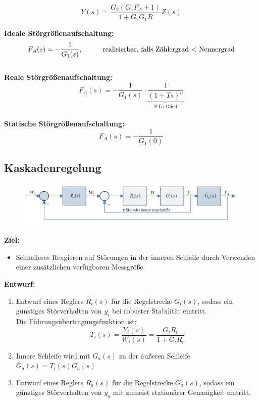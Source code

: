 \documentclass[10pt,a4paper]{article}
\newcommand{\tab}[1][1]{\hspace*{#1cm}}
\begin{document}
$$
	Y(s) = \frac{G_2(G_1 F_A + 1)}{1 + G_2 G_1 R} Z(s)
$$

\textbf{Ideale Störgrößenaufschaltung:}
$$
	F_A(s) = -\frac{1}{G_1(s)}, \tab \text{realisierbar, falls Zählergrad $<$ Nennergrad}
$$ ~\\

\textbf{Reale Störgrößenaufschaltung:}
$$
	F_A(s) = -\frac{1}{G_1(s)} ⋅ \underbrace{\frac{1}{(1 + Ts)^n}}_{\text{PTn-Glied}}
$$ ~\\

\textbf{Statische Störgrößenaufschaltung:}
$$
	F_A(s) = -\frac{1}{G_1(0)}
$$

\subsection{Kaskadenregelung}
\begin{figure}[H]
	\includegraphics[width=0.8\columnwidth]{imgs/abb7_5.png}
\end{figure}

\textbf{Ziel:}
\begin{itemize}
	\item Schnelleres Reagieren auf Störungen in der inneren Schleife durch Verwenden einer zusätzlichen verfügbaren Messgröße
\end{itemize}

\textbf{Entwurf:}
\begin{enumerate}
	\item Entwurf eines Reglers $R_i(s)$ für die Regelstrecke $G_i(s)$, sodass ein günstiges Störverhalten von $y_i$ bei robuster Stabilität eintritt. \\
	Die Führungsübertragungsfunktion ist:
	$$
		T_i(s) = \frac{Y_i(s)}{W_i(s)} = \frac{G_i R_i}{1 + G_i R_i}
	$$
	\item Innere Schleife wird mit $G_a(s)$ zu der äußeren Schleife $\bar{G}_a(s) = T_i(s)G_a(s)$
	\item Entwurf eines Reglers $R_a(s)$ für die Regelstrecke $\bar G_a(s)$, sodass ein günstiges Störverhalten von $y_a$ mit zumeist stationärer Genauigkeit eintritt. \\
\end{enumerate}
\end{document}
